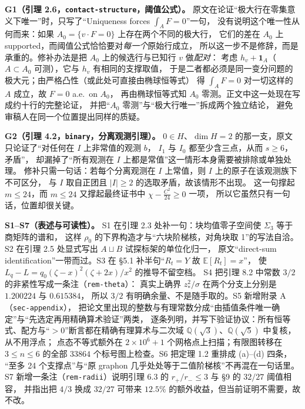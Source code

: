 \documentclass[UTF8,11pt]{ctexart}
\newcommand{\E}{\mathbb{E}}
\newcommand{\file}[1]{\texttt{#1}}
\begin{document}
\textbf{G1（引理 2.6，\file{contact-structure}，阈值公式）。}
原文在论证``极大行在零集意义下唯一''时，只写了``Uniqueness forces $\int_A F=0$''一句，
没有说明这个唯一性从何而来：如果 $A_0=\{v\cdot F=0\}$ 上存在两个不同的极大行，
它们的差在 $A_0$ 上 supported，而阈值公式恰恰要对\emph{每一个}原始行成立，
所以这一步不是修辞，而是承重的。修补办法是把 $A_0$ 上的候选行与已知行 $v$ 做\emph{配对}：
考虑 $h_v+\mathbf 1_A$（$A\subset A_0$ 可测），它与 $h_v$ 有相同的支撑取值，
于是二者都必须是同一变分问题的极大元；由严格凸性（或此处可直接由椭球恒等式）
得 $\int_A F=0$ 对一切这样的 $A$ 成立，故 $F=0$ a.e.\ on $A_0$，
再由椭球恒等式知 $A_0$ 零测。正文中这一处现在写成约十行的完整论证，
并把``$A_0$ 零测''与``极大行唯一''拆成两个独立结论，
避免审稿人在同一个位置提出同样的质疑。

\textbf{G2（引理 4.2，\file{binary}，分离观测引理）。}
$0\in H$、$\dim H=2$ 的那一支，原文只论证了``对任何在 $I$ 上非常值的观测 $b$，
$I_1$ 与 $I_0$ 都至少含三点，从而 $s\ge6$，矛盾''，
却漏掉了``所有观测在 $I$ 上都是常值''这一情形本身需要被排除或单独处理。
修补只需一句话：若每个分离观测在 $I$ 上常值，则 $I$ 上的原子在该观测族下不可区分，
与 $I$ 取自正团且 $|I|\ge2$ 的选取矛盾，故该情形不出现。
这一句撑起 $m\le24$，而 $m\le24$ 又撑起最终证书中 $\chi-\frac{C^2}{24}\ge0$ 一项，
所以它虽然只有一句话，位置却很关键。

\textbf{S1--S7（表述与可读性）。}
S1 在引理 2.3 处补一句：块均值零子空间使 $\Sigma_3$ 等于商矩阵的谱和，
这样 $\rho_0$ 的下界构造才与``六块阶梯核，对角块取 1''的写法自洽。
S2 在引理 2.5 处显式写出 $A\sqcup B$ 试探标架的单位化归一，
原文``direct-sum identification''一带而过。S3 在 \S5.1 补半句``$R_t=Y$ 故 $\E[R_t]=x$''，
使 $L_q-L=q_0(\zeta-x)^2(\zeta+2x)/x^2$ 的推导不留空档。
S4 把引理 8.2 中常数 $3/2$ 的非紧性写成一条注（\file{rem-theta}）：
真实上确界 $z_*^2/\sigma$ 在两个分支上分别是 $1.200224$ 与 $0.615384$，
所以 $3/2$ 有明确余量、不是随手取的。S5 新增附录 A（\file{sec-appendix}），
把论文里出现的整数与有理常数分成``由插值条件唯一确定''与``先选定再用精确算术验证''两类，
逐条列明，并写下验证协议：所有恒等式、配方与``$>0$''断言都在精确有理算术与二次域
$\mathbb Q(\sqrt3)$、$\mathbb Q(\sqrt5)$ 中复核，从不用浮点；
点态不等式额外在 $2\times10^6+1$ 个网格点上扫描；有限图转移在 $3\le n\le6$ 的全部
$33864$ 个标号图上检查。S6 把定理 1.2 重排成 (a)--(d) 四条，
``至多 24 个支撑点''与``原 graphon 几乎处处等于二值阶梯核''不再混在一句话里。
S7 新增一条注（\file{rem-radii}）说明引理 6.3 的 $r_+/r_-\le3$ 与 \S9 的 $32/27$ 阈值相容，
并指出把 $4/3$ 换成 $32/27$ 可带来 $12.5\%$ 的额外收益，但当前证明不需要，故不改。
\end{document}
